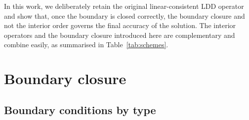 \documentclass[preprint,review,12pt]{elsarticle}
\begin{document}
In this work, we deliberately retain the original linear-consistent LDD operator and show that, once the boundary is closed correctly, the boundary closure and not the interior order governs the final accuracy of the solution.
The interior operators and the boundary closure introduced here are complementary and combine easily, as summarised in Table~\ref{tab:schemes}.

\section{Boundary closure}
\label{sec:closure}

\subsection{Boundary conditions by type}
\label{sec:bytype}
\end{document}
